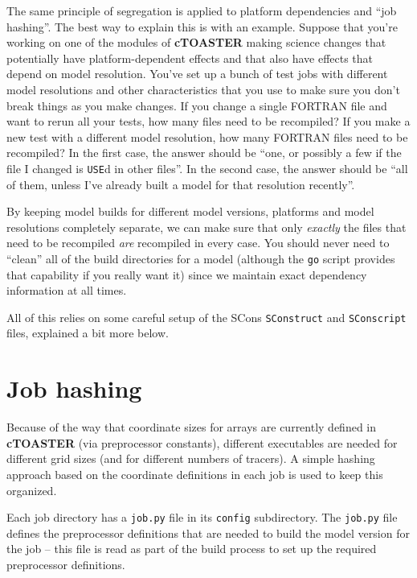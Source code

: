 \documentclass[a4paper,10pt,article]{memoir}
\begin{document}
The same principle of segregation is applied to platform dependencies
and ``job hashing''.  The best way to explain this is with an
example.  Suppose that you're working on one of the modules of \textbf{cTOASTER}
making science changes that potentially have platform-dependent
effects and that also have effects that depend on model resolution.
You've set up a bunch of test jobs with different model resolutions
and other characteristics that you use to make sure you don't break
things as you make changes.  If you change a single FORTRAN file and
want to rerun all your tests, how many files need to be recompiled?
If you make a new test with a different model resolution, how many
FORTRAN files need to be recompiled?  In the first case, the answer
should be ``one, or possibly a few if the file I changed is
\texttt{USE}d in other files''.  In the second case, the answer should
be ``all of them, unless I've already built a model for that
resolution recently''.

By keeping model builds for different model versions, platforms and
model resolutions completely separate, we can make sure that only
\emph{exactly} the files that need to be recompiled \emph{are}
recompiled in every case.  You should never need to ``clean'' all of
the build directories for a model (although the \texttt{go} script
provides that capability if you really want it) since we maintain
exact dependency information at all times.

All of this relies on some careful setup of the SCons
\texttt{SConstruct} and \texttt{SConscript} files, explained a bit
more below.

\section{Job hashing}

Because of the way that coordinate sizes for arrays are currently
defined in \textbf{cTOASTER} (via preprocessor constants), different executables
are needed for different grid sizes (and for different numbers of
tracers).  A simple hashing approach based on the coordinate
definitions in each job is used to keep this organized.

Each job directory has a \texttt{job.py} file in its \texttt{config}
subdirectory.  The \texttt{job.py} file defines the preprocessor
definitions that are needed to build the model version for the job --
this file is read as part of the build process to set up the required
preprocessor definitions.
\end{document}
